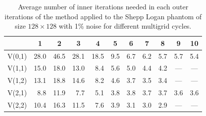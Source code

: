 \begin{table}[htp]
\caption{Average number of inner iterations needed in each outer iterations of the method applied to the Shepp Logan phantom of size $128 \times 128$ with 1\% noise for different multigrid cycles.}
\begin{center}
\begin{tabular}{|l|r|r|r|r|r|r|r|r|r|r|}
\hline
& \multicolumn{1}{c|}{1} & \multicolumn{1}{c|}{2} & \multicolumn{1}{c|}{3} & \multicolumn{1}{c|}{4} & \multicolumn{1}{c|}{5} & \multicolumn{1}{c|}{6} & \multicolumn{1}{c|}{7} & \multicolumn{1}{c|}{8} & \multicolumn{1}{c|}{9} & \multicolumn{1}{c|}{10} \\
\hline
V(0,1) & 28.0 & 46.5 & 28.1 & 18.5 & 9.5 & 6.7 & 6.2 & 5.7 & 5.7 & 5.4 \\
V(1,1) & 15.0 & 18.0 & 13.0 & 8.4 & 5.6 & 5.0 & 4.4 & 4.2 & \multicolumn{1}{c|}{---} & \multicolumn{1}{c|}{---}\\
V(1,2) & 13.1 & 18.8 & 14.6 & 8.2 & 4.6 & 3.7 & 3.5 & 3.4 & \multicolumn{1}{c|}{---} & \multicolumn{1}{c|}{---} \\
V(2,1) & 8.8 & 11.9 & 7.7 & 5.1 & 3.8 & 3.8 & 3.7 & 3.7 & 3.6 & 3.6 \\
V(2,2) & 10.4 &16.3 & 11.5 & 7.6 & 3.9 & 3.1 & 3.0 & 2.9 & \multicolumn{1}{c|}{---} & \multicolumn{1}{c|}{---} \\
\hline
\end{tabular}
\end{center}
\label{tab:its_cycling}
\end{table}%


